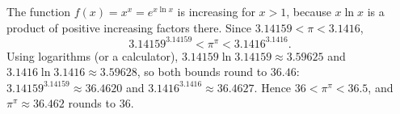 The function $f(x)=x^x=e^{x\ln x}$ is increasing for $x>1$, because $x\ln x$ is a product of positive increasing factors there. Since $3.14159<\pi<3.1416$,
\[3.14159^{3.14159}<\pi^\pi<3.1416^{3.1416}.\]
Using logarithms (or a calculator), $3.14159\ln3.14159\approx3.59625$ and $3.1416\ln3.1416\approx3.59628$, so both bounds round to $36.46$: $3.14159^{3.14159}\approx36.4620$ and $3.1416^{3.1416}\approx36.4627$. Hence $36<\pi^\pi<36.5$, and $\pi^\pi\approx36.462$ rounds to $\boxed{36}$.
